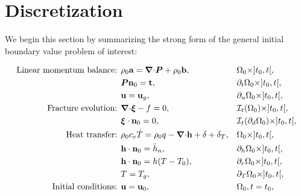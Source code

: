 \section{Discretization}
\label{section: Chapter2/discretization}

We begin this section by summarizing the strong form of the general initial boundary value problem of interest:
\begin{mdframed}[
  frametitle={The initial boundary value problem for the time interval $t \in I = [t_0, t_f]$},
  frametitlebackgroundcolor=gray!20,
  backgroundcolor=gray!5,
  linewidth=0pt,
  nobreak=true
  ]
  \vspace{-1em}
  \begin{align*}
    \text{Linear momentum balance: } & \rho_0 \bta = \divergence \bfP + \rho_0 \btb,                       &  & \body_0 \times ]t_0, t[,                          \\
                                     & \bfP \normal_0 = \btt,                                              &  & \partial_t\body_0 \times ]t_0, t[,                \\
                                     & \btu = \btu_g,                                                      &  & \partial_u\body_0 \times ]t_0, t[,                \\
    \text{Fracture evolution: }      & \divergence \bs{\xi} - f = 0,                                       &  & \mathcal{I}_t(\body_0) \times ]t_0, t[,           \\
                                     & \bs{\xi}\cdot\normal_0 = 0,                                         &  & \mathcal{I}_t(\partial_d\body_0) \times ]t_0, t[, \\
    \text{Heat transfer: }           & \rho_0c_v\dot{T} = \rho_0 q - \divergence \bth + \delta + \delta_T, &  & \body_0 \times ]t_0, t[,                          \\
                                     & \bth \cdot \normal_0 = \bar{h}_n,                                   &  & \partial_h\body_0 \times ]t_0, t[,                \\
                                     & \bth \cdot \normal_0 = h(T - T_0),                                  &  & \partial_r\body_0 \times ]t_0, t[,                \\
                                     & T = T_g,                                                            &  & \partial_T\body_0 \times ]t_0, t[,                \\
    \text{Initial conditions: }      & \btu = \btu_0,                                                      &  & \body_0, t = t_0,                                 \\

\end{align*}
\end{mdframed}

